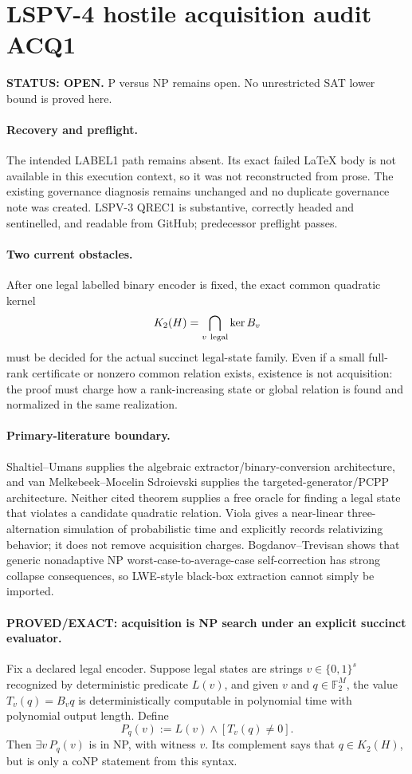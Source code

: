 \documentclass[11pt]{article}
\begin{document}
\section*{LSPV-4 hostile acquisition audit ACQ1}
\textbf{STATUS: OPEN.} P versus NP remains open. No unrestricted SAT lower bound is proved here.

\paragraph{Recovery and preflight.} The intended LABEL1 path remains absent. Its exact failed LaTeX body is not available in this execution context, so it was not reconstructed from prose. The existing governance diagnosis remains unchanged and no duplicate governance note was created. LSPV-3 QREC1 is substantive, correctly headed and sentinelled, and readable from GitHub; predecessor preflight passes.

\paragraph{Two current obstacles.} After one legal labelled binary encoder is fixed, the exact common quadratic kernel
\[K_2(H)=\bigcap_{v\ {\rm legal}}\ker B_v\]
must be decided for the actual succinct legal-state family. Even if a small full-rank certificate or nonzero common relation exists, existence is not acquisition: the proof must charge how a rank-increasing state or global relation is found and normalized in the same realization.

\paragraph{Primary-literature boundary.} Shaltiel--Umans supplies the algebraic extractor/binary-conversion architecture, and van Melkebeek--Mocelin Sdroievski supplies the targeted-generator/PCPP architecture. Neither cited theorem supplies a free oracle for finding a legal state that violates a candidate quadratic relation. Viola gives a near-linear three-alternation simulation of probabilistic time and explicitly records relativizing behavior; it does not remove acquisition charges. Bogdanov--Trevisan shows that generic nonadaptive NP worst-case-to-average-case self-correction has strong collapse consequences, so LWE-style black-box extraction cannot simply be imported.

\paragraph{PROVED/EXACT: acquisition is NP search under an explicit succinct evaluator.} Fix a declared legal encoder. Suppose legal states are strings $v\in\{0,1\}^s$ recognized by deterministic predicate $L(v)$, and given $v$ and $q\in\mathbb F_2^M$, the value $T_v(q)=B_vq$ is deterministically computable in polynomial time with polynomial output length. Define
\[P_q(v):=L(v)\wedge[T_v(q)\neq0].\]
Then $\exists v\,P_q(v)$ is in NP, with witness $v$. Its complement says that $q\in K_2(H)$, but is only a coNP statement from this syntax.
\end{document}
